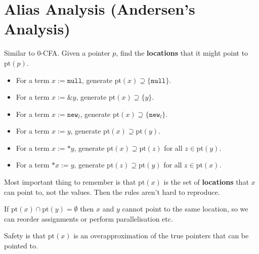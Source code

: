 \documentclass[a4paper, 11pt]{article}
\begin{document}
\section*{Alias Analysis (Andersen's Analysis)}
{
    Similar to 0-CFA. Given a pointer \(p\), find the \textbf{locations} that it might point to \(\text{pt}(p)\).

    \begin{itemize}
    \item For a term \(x := \texttt{null}\), generate \(\text{pt}(x) \supseteq \{\texttt{null}\}\).
    \item For a term \(x := \&y\), generate \(\text{pt}(x) \supseteq \{y\}\).
    \item For a term \(x := \texttt{new}_l\), generate \(\text{pt}(x) \supseteq \{\texttt{new}_l\}\).
    \item For a term \(x := y\), generate \(\text{pt}(x) \supseteq \text{pt}(y)\).
    \item For a term \(x := *y\), generate \(\text{pt}(x) \supseteq \text{pt}(z)\) for all \(z \in \text{pt}(y)\).
    \item For a term \(*x := y\), generate \(\text{pt}(z) \supseteq \text{pt}(y)\) for all \(z \in \text{pt}(x)\).
    \end{itemize}

    Most important thing to remember is that \(\text{pt}(x)\) is the set of \textbf{locations} that \(x\) can point to, not the values. Then the rules aren't hard to reproduce.

    If \(\text{pt}(x) \cap \text{pt}(y) = \emptyset\) then \(x\) and \(y\) cannot point to the same location, so we can reorder assignments or perform parallelisation etc.

    Safety is that \(\text{pt}(x)\) is an overapproximation of the true pointers that can be pointed to.
}
\end{document}
